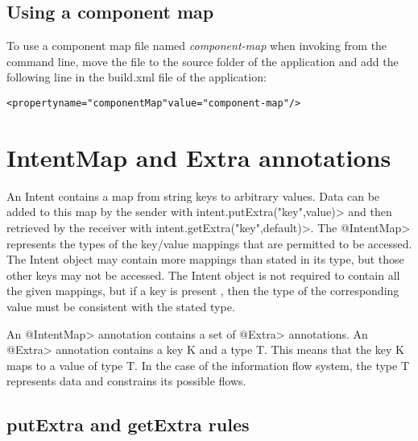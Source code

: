 \subsection{Using a component map}
To use a component map file named \emph{component-map} 
when invoking \TheFlowChecker{} from the command line, move the file to the
source folder of the application and 
add the following line in the build.xml file of the application:
\begin{alltt}
<property name="componentMap" value="component-map"/>
\end{alltt}

\section{IntentMap and Extra annotations}
An Intent contains a map from string keys to arbitrary values. Data can be added
to this map by the sender with \<intent.putExtra("key",value)> and then
retrieved by the receiver with \<intent.getExtra("key",default)>. 
The \<@IntentMap> represents the types
of the key/value mappings that are permitted to be accessed. The Intent object
may contain more mappings than stated in its type, but those other keys may not
be accessed. The Intent object is not required to contain all the given
mappings, but if a key is present , then the type of the corresponding value must
be consistent with the stated type. 

An \<@IntentMap> annotation contains a set of \<@Extra> annotations. An
\<@Extra> annotation contains a key K and a type T. This means that the key K 
maps to a value of type T. In the case of the information flow system, the type T
represents data and constrains its possible flows. 

\subsection{putExtra and getExtra rules}

